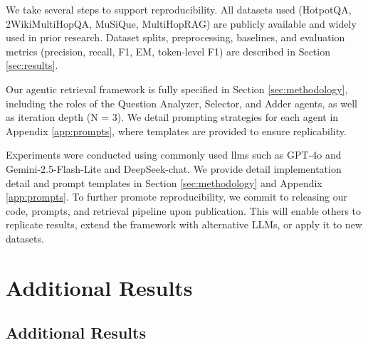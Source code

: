 \documentclass{article} %
\begin{document}
We take several steps to support reproducibility. All datasets used (HotpotQA, 2WikiMultiHopQA, MuSiQue, MultiHopRAG) are publicly available and widely used in prior research. Dataset splits, preprocessing, baselines, and evaluation metrics (precision, recall, F1, EM, token-level F1) are described in Section \ref{sec:results}.

Our agentic retrieval framework is fully specified in Section \ref{sec:methodology}, including the roles of the Question Analyzer, Selector, and Adder agents, as well as iteration depth (N = 3). We detail prompting strategies for each agent in Appendix \ref{app:prompts}, where templates are provided to ensure replicability.

Experiments were conducted using commonly used llms such as GPT-4o and Gemini-2.5-Flash-Lite and DeepSeek-chat. We provide detail implementation detail and prompt templates in Section \ref{sec:methodology} and Appendix \ref{app:prompts}. To further promote reproducibility, we commit to releasing our code, prompts, and retrieval pipeline upon publication. This will enable others to replicate results, extend the framework with alternative LLMs, or apply it to new datasets.







\newpage
\appendix
\section{Additional Results}
\label{app:additional_results_error_analysis}
\subsection{Additional Results}
\end{document}
